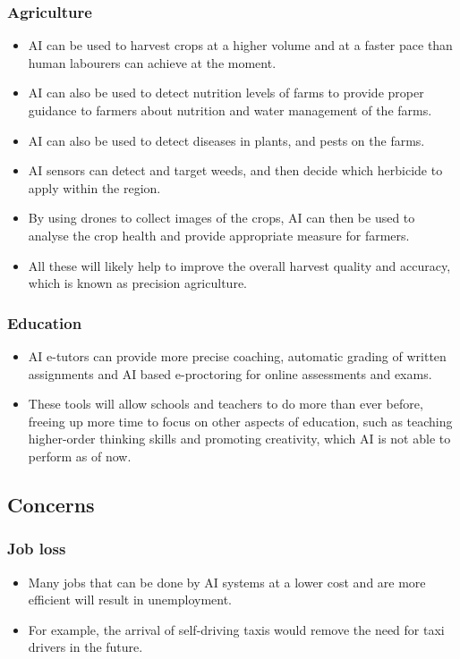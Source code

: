 \documentclass[11pt]{article}
\begin{document}
\subsubsection{Agriculture}
\label{sec:org6f24533}
\begin{itemize}
\item AI can be used to harvest crops at a higher volume and at a faster pace than human labourers can achieve at the moment.
\item AI can also be used to detect nutrition levels of farms to provide proper guidance to farmers about nutrition and water management of the farms.
\item AI can also be used to detect diseases in plants, and pests on the farms.
\item AI sensors can detect and target weeds, and then decide which herbicide to apply within the region.
\item By using drones to collect images of the crops, AI can then be used to analyse the crop health and provide appropriate measure for farmers.
\item All these will likely help to improve the overall harvest quality and accuracy, which is known as precision agriculture.
\end{itemize}

\subsubsection{Education}
\label{sec:org6452e24}
\begin{itemize}
\item AI e-tutors can provide more precise coaching, automatic grading of written assignments and AI based e-proctoring for online assessments and exams.
\item These tools will allow schools and teachers to do more than ever before, freeing up more time to focus on other aspects of education, such as teaching higher-order thinking skills and promoting creativity, which AI is not able to perform as of now.
\end{itemize}

\subsection{Concerns}
\label{sec:org6b4bb25}

\subsubsection{Job loss}
\label{sec:org39be912}
\begin{itemize}
\item Many jobs that can be done by AI systems at a lower cost and are more efficient will result in unemployment.
\item For example, the arrival of self-driving taxis would remove the need for taxi drivers in the future.
\end{itemize}
\end{document}
